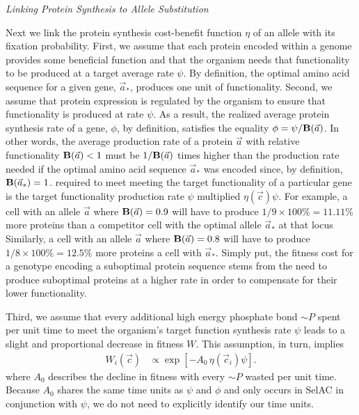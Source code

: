 \documentclass[12pt,letterpaper]{article}
\renewcommand{\subsection}[1]{%
\bigskip
\begin{center}
\begin{large}
\normalfont\itshape #1
\end{large}
\end{center}}
\newcommand{\Func}{\ensuremath{\text{\textbf{B}}}\xspace}
\newcommand{\simP}{\ensuremath{\sim P}\xspace}
\newcommand{\selac}{SelAC\xspace}
\newcommand{\aoptvec}{\ensuremath{\Vec{a}_*}\xspace}
\newcommand{\avec}{\ensuremath{\Vec{a}}\xspace}
\newcommand{\cveci}{\ensuremath{\cvec_i}\xspace}
\newcommand{\cvec}{\ensuremath{\Vec{c}}\xspace}
\begin{document}
\subsection{Linking Protein Synthesis to Allele Substitution}
Next we link the protein synthesis cost-benefit function $\eta$ of an allele with its fixation probability.
First, we assume that each protein encoded within a genome provides some beneficial function and that the organism needs that functionality to be produced at a target average rate $\psi$.
By definition, the optimal amino acid sequence for a given gene, \aoptvec, produces one unit of functionality.
Second, we assume that protein expression is regulated by the organism to ensure that functionality is produced at rate $\psi$.
As a result, the realized average protein synthesis rate of a gene, $\phi$, by definition, satisfies the equality  $\phi = \psi/\Func(\avec)$.
In other words, the average production rate of a protein \avec with relative functionality $\Func(\avec) < 1$ must be $1/\Func(\avec)$ times higher than the production rate needed if the optimal amino acid sequence \aoptvec was encoded since, by definition, $\Func(\aoptvec) = 1$.
 required to meet meeting the target functionality of a particular gene is the target functionality production rate $\psi$ multiplied  $\eta(\cvec) \psi$.
For example, a cell with an allele \avec where $\Func(\avec) = 0.9$ will have to produce $1/9 \times 100\%=  11.11\%$ more proteins than a competitor cell with the optimal allele \aoptvec at that locus 
Similarly, a cell with an allele \avec where $\Func(\avec) = 0.8$ will have to produce $1/8 \times 100\%=  12.5\%$ more proteins a cell with \aoptvec.  
Simply put, the fitness cost for a genotype encoding a suboptimal protein sequence stems from the need to produce suboptimal proteins at a higher rate in order to compensate for their lower functionality.


Third, we assume that every additional high energy phosphate bond \simP spent per unit time to meet the organism's target function synthesis rate $\psi$ leads to a slight and proportional decrease in fitness $W$.
This assumption, in turn, implies
\begin{align}
  W_i\left(\cvec\right) &\propto \exp\left[- A_0 \, \eta(\cveci) \psi\right].
\end{align}
where $A_0$ describes the decline in fitness with every \simP wasted per unit time.
Because $A_0$ shares the same time units as $\psi$ and $\phi$ and only occurs in \selac in conjunction with $\psi$, we do not need to explicitly identify our time units.
\end{document}

